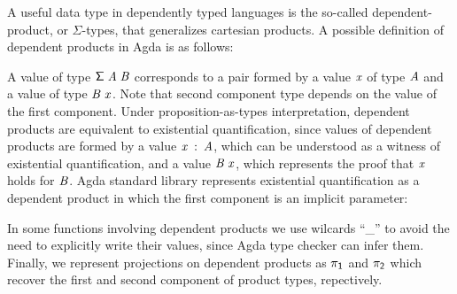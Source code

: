 \documentclass[sigplan, anonymous, review]{acmart}
\makeatletter
\newcommand{\anonymous}{\kern0.06em \vbox{\hrule\@width.5em}}
\def\resethooks{%
  \global\let\SaveRestoreHook\empty
  \global\let\ColumnHook\empty}
\newcommand{\hsindent}[1]{\quad}%
\let\hspre\empty
\let\hspost\empty
\theoremstyle{definition}
\newcommand{\D}[1]{\blue{\mathsf{#1}}}
\newcommand{\C}[1]{\red{\mathsf{#1}}}
\newcommand{\F}[1]{\green{\mathsf{#1}}}
\newcommand{\V}[1]{\purple{\mathit{#1}}}
\makeatother
\begin{document}
A useful data type in dependently typed languages is the so-called dependent-product,
or $\Sigma$-types, that generalizes cartesian products. A possible definition of dependent products 
in Agda is as follows:
\resethooks
A value of type \ensuremath{\D{\Sigma}\;\V{A}\;\V{B}} corresponds to a pair formed by a value \ensuremath{\V{x}} of type \ensuremath{\V{A}} and 
a value of type \ensuremath{\V{B}\;\V{x}}. Note that second component type depends on the value of the first 
component. Under proposition-as-types interpretation, dependent products are equivalent
to existential quantification, since values of dependent products are formed by a value \ensuremath{\V{x}\;\mathbin{:}\;\V{A}},
which can be understood as a witness of existential quantification, and a value \ensuremath{\V{B}\;\V{x}}, which
represents the proof that \ensuremath{\V{x}} holds for \ensuremath{\V{B}}. Agda standard library represents existential
quantification as a dependent product in which the first component is an implicit parameter:
\resethooks
In some functions involving dependent products we use wilcards ``\_'' to avoid the need to
explicitly write their values, since Agda type checker can infer them.
Finally, we represent projections on dependent products as \ensuremath{\F{\pi_1}} and \ensuremath{\F{\pi_2}} which recover the first
and second component of product types, repectively.
\end{document}
